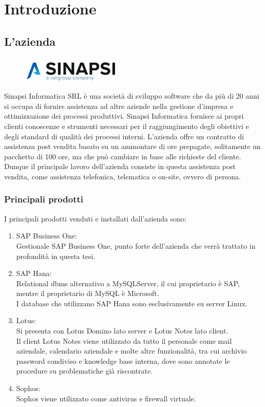 
\chapter{Introduzione}
\label{cap:introduzione}

\section{L'azienda}
\begin{figure}[!h] 
	\centering 
	\includegraphics{immagini/logo_sinapsi.jpg} 
\end{figure}
Sinapsi Informatica SRL è una società di sviluppo software che da più di 20 anni si occupa di fornire assistenza ad altre aziende nella gestione d'impresa e ottimizzazione dei processi produttivi.
Sinapsi Informatica fornisce ai propri clienti conoscenze e strumenti necessari per il raggiungimento degli obiettivi e degli standard di qualità dei processi interni.
L'azienda offre un contratto di assistenza post vendita basato su un ammontare di ore prepagate, solitamente un pacchetto di 100 ore, ma che può cambiare in base alle richieste del cliente.
Dunque il principale lavoro dell'azienda consiste in questa assistenza post vendita, come assistenza telefonica, telematica o on-site, ovvero di persona.
\subsection{Principali prodotti}
I principali prodotti venduti e installati dall'azienda sono:
\begin{enumerate}
	\item {SAP Business One:} \\Gestionale SAP Business One, punto forte dell'azienda che verrà trattato in profondità in questa tesi.
	\item {SAP Hana:} \\Relational \gls{dbms} alternativo a MySQLServer, il cui proprietario è SAP, mentre il proprietario di MySQL è Microsoft.\\I database che utilizzano SAP Hana sono esclusivamente su server Linux.
	\item {Lotus:} \\Si presenta con Lotus Domino lato server e Lotus Notes lato client.\\Il client Lotus Notes viene utilizzato da tutto il personale come mail aziendale, calendario aziendale e molte altre funzionalità, tra cui archivio password condiviso e knowledge base interna, dove sono annotate le procedure su problematiche già riscontrate.
	\item {Sophos:} \\Sophos viene utilizzato come antivirus e firewall virtuale.
\end{enumerate}



